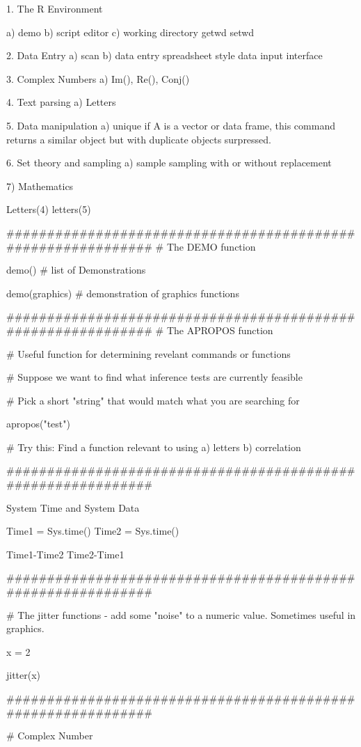 1. The R Environment

a) demo
b) script editor
c) working directory
getwd
 		setwd

2. Data Entry
a) scan
b) data entry spreadsheet style data input interface

3. Complex Numbers 
a) Im(), Re(), Conj()

4. Text parsing
a) Letters

5. Data manipulation
a) unique
if A is a vector or data frame, this command returns a similar object but with duplicate objects surpressed.


6. Set theory and sampling
a) sample sampling with or without replacement

7) Mathematics


Letters(4)
letters(5)

#############################################################
# The DEMO function 

demo() #  list of Demonstrations

demo(graphics) # demonstration of graphics functions


#############################################################
# The APROPOS function 

# Useful function for determining revelant commands or functions

# Suppose we want to find what inference tests are currently feasible

# Pick a short "string" that would match what you are searching for

apropos("test")

# Try this: Find a function relevant to using a) letters b) correlation


#############################################################

System Time and System Data


Time1 = Sys.time()
Time2 = Sys.time()

Time1-Time2
Time2-Time1




#############################################################

# The jitter functions - add some "noise" to a numeric value. Sometimes useful in graphics.

x = 2

jitter(x)

#############################################################

# Complex Number

